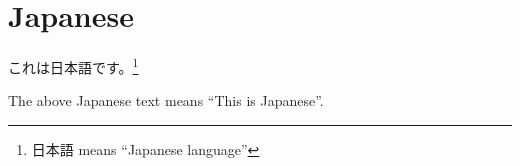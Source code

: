 \documentclass[letterpaper, 12pt]{article}
\newcommand{\q}[1]{``#1''} %
\begin{document}
\section{Japanese}
\begin{center}
    これは日本語です。\footnote{日本語 means \q{Japanese language}}
\end{center}
The above Japanese text means \q{This is Japanese}.
\end{document}
